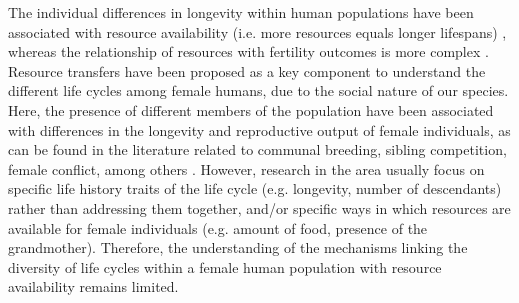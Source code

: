 \documentclass{article}
\begin{document}
The individual differences in longevity within human populations have been associated with resource availability (i.e. more resources equals longer lifespans) \citep{kaplan2003embodied}, whereas the relationship of resources with fertility outcomes is more complex \citep{mulder1998demographic,sear2016understanding}. Resource transfers have been proposed as a key component to understand the different life cycles among female humans, due to the social nature of our species. Here, the presence of different members of the population have been associated with differences in the longevity and reproductive output of female individuals, as can be found in the literature related to communal breeding, sibling competition, female conflict, among others \citep{ivey2000cooperative,nitsch2013elder,mace2012female,sear2011much}. However, research in the area usually focus on specific life history traits of the life cycle (e.g. longevity, number of descendants) rather than addressing them together, and/or specific ways in which resources are available for female individuals (e.g. amount of food, presence of the grandmother). Therefore, the understanding of the mechanisms linking the diversity of life cycles within a female human population with resource availability remains limited.
\end{document}
